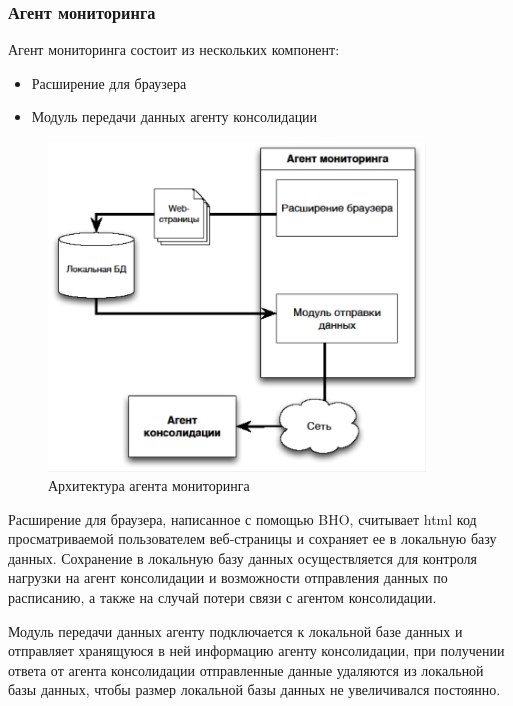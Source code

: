 \documentclass[russian, utf8, emptystyle]{eskdtext}
\begin{document}
\subsubsection{Агент мониторинга}
Агент мониторинга состоит из нескольких компонент:
\begin{itemize}
	\item Расширение для браузера
	\item Модуль передачи данных агенту консолидации
\end{itemize}
\begin{figure}[h]
	\begin{center}
		\includegraphics[width=10cm]{pic/agent1.png}
		\caption{Архитектура агента мониторинга}
		\label{fig:low_sigma}
	\end{center}
\end{figure}

Расширение для браузера, написанное с помощью BHO,  считывает html код просматриваемой пользователем веб-страницы и сохраняет ее в локальную базу данных. Сохранение в локальную базу данных осуществляется для контроля нагрузки на агент консолидации и возможности отправления данных по расписанию, а также на случай потери связи с агентом консолидации.

Модуль передачи данных агенту подключается к локальной базе данных и отправляет хранящуюся в ней информацию агенту консолидации, при получении ответа от агента консолидации отправленные данные удаляются из локальной базы данных, чтобы размер локальной базы данных не увеличивался постоянно.
\end{document}
